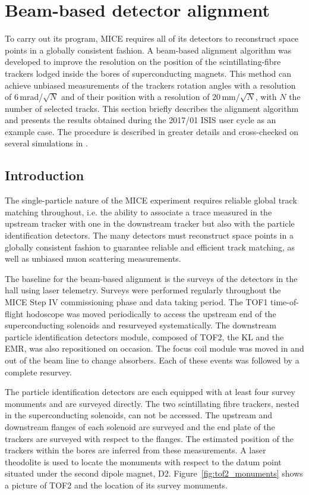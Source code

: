 \graphicspath{{09-Detector-alignment/Figures/}}

\section{Beam-based detector alignment}
\label{Sect:DA}
To carry out its program, MICE requires all of its detectors to reconstruct space points in a globally consistent fashion. A beam-based alignment algorithm was developed to improve the resolution on the position of the scintillating-fibre trackers lodged inside the bores of superconducting magnets. This method can achieve unbiased measurements of the trackers rotation angles with a resolution of 6\,mrad/$\sqrt{N}$ and of their position with a resolution of 20\,mm/$\sqrt{N}$, with $N$ the number of selected tracks. This section briefly describes the alignment algorithm and presents the results obtained during the 2017/01 ISIS user cycle as an example case. The procedure is described in greater details and cross-checked on several simulations in \cite{2018arXiv1805.06623T}.

\subsection{Introduction}
\label{SubSect:DA_Intro}
The single-particle nature of the MICE experiment requires reliable global track matching throughout, i.e. the ability to associate a trace measured in the upstream tracker with one in the downstream tracker but also with the particle identification detectors. The many detectors must reconstruct space points in a globally consistent fashion to guarantee reliable and efficient track matching, as well as unbiased muon scattering measurements.

The baseline for the beam-based alignment is the surveys of the detectors in the hall using laser telemetry. Surveys were performed regularly throughout the MICE Step IV commissioning phase and data taking period. The TOF1 time-of-flight hodoscope was moved periodically to access the upstream end of the superconducting solenoids and resurveyed systematically. The downstream particle identification detectors module, composed of TOF2, the KL and the EMR, was also repositioned on occasion. The focus coil module was moved in and out of the beam line to change absorbers. Each of these events was followed by a complete resurvey.

The particle identification detectors are each equipped with at least four survey monuments and are surveyed directly. The two scintillating fibre trackers, nested in the superconducting solenoids, can not be accessed. The upstream and downstream flanges of each solenoid are surveyed and the end plate of the trackers are surveyed with respect to the flanges. The estimated position of the trackers within the bores are inferred from these measurements. A laser theodolite is used to locate the monuments with respect to the datum point situated under the second dipole magnet, D2. Figure~\ref{fig:tof2_monuments} shows a picture of TOF2 and the location of its survey monuments.

